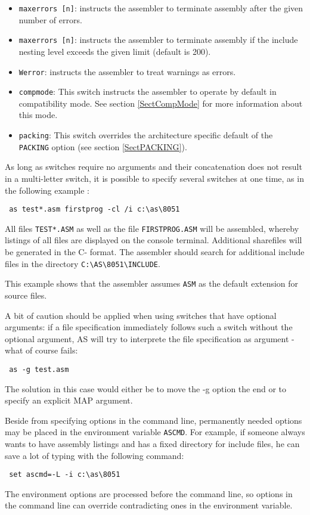 \documentclass[12pt,twoside]{report}
\newcommand{\tty}[1]{{\tt #1}}
\newcommand{\asname}{{AS}}
\begin{document}
\begin{itemize}
{      environments tuned for this format, however also suppresses the
      display of precise error positions in macro bodies!}
\item{{\tt maxerrors [n]}: instructs the assembler to terminate
      assembly after the given number of errors.}
\item{{\tt maxerrors [n]}: instructs the assembler to terminate
      assembly if the include nesting level exceeds the given limit
      (default is 200).}
\item{{\tt Werror}: instructs the assembler to treat warnings as errors.}
\item{\tty{compmode}: This switch instructs the assembler to operate by
      default in compatibility mode.  See section \ref{SectCompMode} for
      more information about this mode.}
\item{\tty{packing}: This switch overrides the architecture specific
      default of the {\tt PACKING} option (see section \ref{SectPACKING}).}
\end{itemize}
As long as switches require no arguments and their concatenation does
not result in a multi-letter switch, it is possible to specify several
switches at one time, as in the following example :
\begin{verbatim}
 as test*.asm firstprog -cl /i c:\as\8051
\end{verbatim}
All files \tty{TEST*.ASM} as well as the file \tty{FIRSTPROG.ASM} will be
assembled, whereby listings of all files are displayed on the
console terminal.  Additional sharefiles will be generated in the C-
format.  The assembler should search for additional include files
in the directory \verb!C:\AS\8051\INCLUDE!.

This example shows that the assembler assumes \tty{ASM} as the default
extension for source files.

A bit of caution should be applied when using switches that have
optional arguments: if a file specification immediately follows such
a switch without the optional argument, \asname{} will try to interprete the
file specification as argument - what of course fails:
\begin{verbatim}
 as -g test.asm
\end{verbatim}
The solution in this case would either be to move the -g option the
end or to specify an explicit MAP argument.


Beside from specifying options in the command line, permanently
needed options may be placed in the environment variable \tty{ASCMD}.  For
example, if someone always wants to have assembly listings and has a
fixed directory for include files, he can save a lot of typing with
the following command:
\begin{verbatim}
 set ascmd=-L -i c:\as\8051
\end{verbatim}
The environment options are processed before the command line,
so options in the command line can override contradicting ones in the
environment variable.
\end{document}
